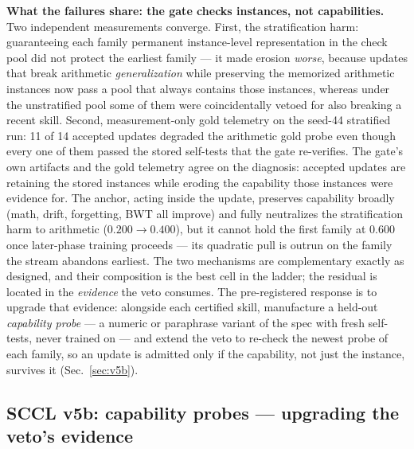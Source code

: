 \documentclass[10pt,conference]{IEEEtran}
\begin{document}
\textbf{What the failures share: the gate checks instances, not capabilities.} Two independent measurements converge. First, the stratification harm: guaranteeing each family permanent instance-level representation in the check pool did not protect the earliest family --- it made erosion \emph{worse}, because updates that break arithmetic \emph{generalization} while preserving the memorized arithmetic instances now pass a pool that always contains those instances, whereas under the unstratified pool some of them were coincidentally vetoed for also breaking a recent skill. Second, measurement-only gold telemetry on the seed-44 stratified run: 11 of 14 accepted updates degraded the arithmetic gold probe even though every one of them passed the stored self-tests that the gate re-verifies. The gate's own artifacts and the gold telemetry agree on the diagnosis: accepted updates are retaining the stored instances while eroding the capability those instances were evidence for. The anchor, acting inside the update, preserves capability broadly (math, drift, forgetting, BWT all improve) and fully neutralizes the stratification harm to arithmetic ($0.200 \to 0.400$), but it cannot hold the first family at $0.600$ once later-phase training proceeds --- its quadratic pull is outrun on the family the stream abandons earliest. The two mechanisms are complementary exactly as designed, and their composition is the best cell in the ladder; the residual is located in the \emph{evidence} the veto consumes. The pre-registered response is to upgrade that evidence: alongside each certified skill, manufacture a held-out \emph{capability probe} --- a numeric or paraphrase variant of the spec with fresh self-tests, never trained on --- and extend the veto to re-check the newest probe of each family, so an update is admitted only if the capability, not just the instance, survives it (Sec.~\ref{sec:v5b}).

\subsection*{SCCL v5b: capability probes --- upgrading the veto's evidence}
\label{sec:v5b}
\end{document}
